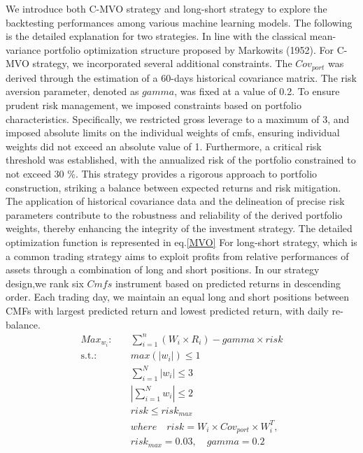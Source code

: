 \documentclass[10pt,letterpaper]{article}
\begin{document}
We introduce both C-MVO strategy and long-short strategy to explore the backtesting performances among various machine learning models. The following is the detailed explanation for two strategies.  In line with the classical mean-variance portfolio optimization structure proposed by Markowits (1952).  For C-MVO strategy, we incorporated several additional constraints. The \(Cov_{port}\) was derived through the estimation of a 60-days historical covariance matrix. The risk aversion parameter, denoted as \(gamma\), was fixed at a value of 0.2. To ensure prudent risk management, we imposed constraints based on portfolio characteristics. Specifically, we restricted gross leverage to a maximum of 3, and imposed absolute limits on the individual weights of cmfs, ensuring individual weights did not exceed an absolute value of 1. Furthermore, a critical risk threshold was established, with the annualized risk of the portfolio constrained to not exceed 30 \%.
This strategy provides a rigorous approach to portfolio construction, striking a balance between expected returns and risk mitigation. The application of historical covariance data and the delineation of precise risk parameters contribute to the robustness and reliability of the derived portfolio weights, thereby enhancing the integrity of the investment strategy. The detailed optimization function is represented in eq.\ref{MVO}
 For long-short strategy, which is a common trading strategy aims to exploit profits from relative performances of assets through a combination of long and short positions. In our strategy design,we rank six \(Cmfs\) instrument based on predicted returns in descending order. Each trading day, we maintain an equal long and short positions between CMFs with largest predicted return and lowest predicted return, with daily re-balance.
\begin{eqnarray}
\label{MVO}
    Max_{w_i}: \quad & \sum_{i=1}^{n} (W_i \times R_i)-gamma \times risk \nonumber \\
\text{s.t.:} \quad & max(|w_i|) \leq 1 \nonumber \\
                         & \sum_{i=1}^{N} |w_i| \leq 3 \\
        & \left| \sum_{i=1}^{N} w_i \right| \leq 2 \nonumber \\
        & risk \leq risk_{max} \nonumber \\
        & where \quad risk=W_i \times Cov_{port} \times W_{i}^T, \nonumber \\
        & risk_{max}=0.03, \quad gamma=0.2 \nonumber
\end{eqnarray}
\end{document}
